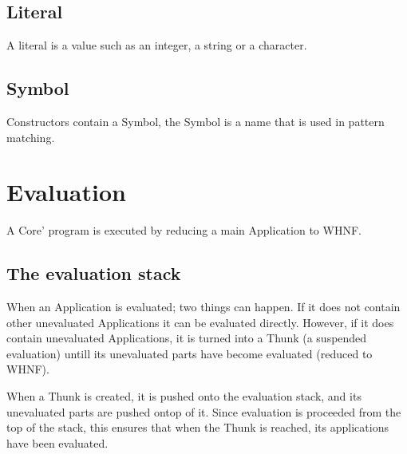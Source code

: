 \subsection{Literal}
A literal is a value such as an integer, a string or a character.

\subsection{Symbol}


Constructors contain a Symbol, the Symbol is a name that is used in pattern matching.


\section{Evaluation}

A Core' program is executed by reducing a main Application to WHNF.

\subsection{The evaluation stack}

When an Application is evaluated; two things can happen. If it does not contain
other unevaluated Applications it can be evaluated directly. However, if it does
contain unevaluated Applications, it is turned into a Thunk (a suspended evaluation)
untill its unevaluated parts have become evaluated (reduced to WHNF).

When a Thunk is created, it is pushed onto the evaluation stack, and its 
unevaluated parts are pushed ontop of it. Since evaluation is proceeded from the
top of the stack, this ensures that when the Thunk is reached, its applications
have been evaluated.






